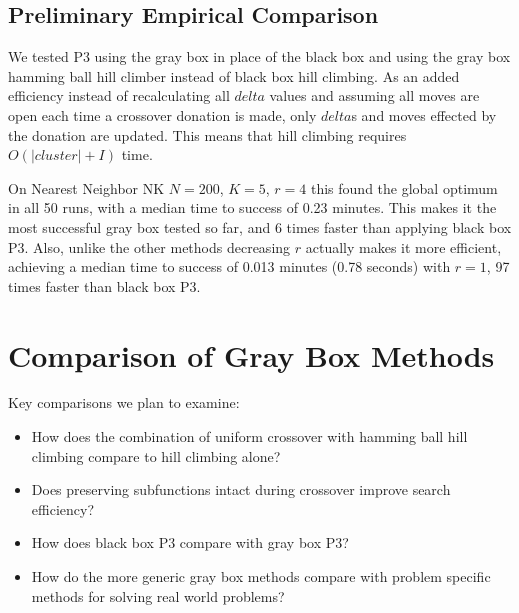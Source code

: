 \subsection{Preliminary Empirical Comparison}
We tested P3 using the gray box  in place of the black box 
and using the gray box hamming ball hill climber instead of black box hill climbing. As an added efficiency
instead of recalculating all $delta$ values and assuming all moves are open each time a crossover donation is made,
only $delta$s and moves effected by the donation are updated. This means that hill climbing requires $O(|cluster|+I)$
time.

On Nearest Neighbor NK
$N=200$, $K=5$, $r=4$ this found the global optimum in all 50 runs, with a median time to success of 0.23 minutes. This makes it the
most successful gray box tested so far, and 6 times faster than applying black box P3. Also, unlike the other
methods decreasing $r$ actually makes it more efficient, achieving a median time to success of 0.013 minutes (0.78 seconds) with $r=1$,
97 times faster than black box P3.
\section{Comparison of Gray Box Methods}
Key comparisons we plan to examine:
\begin{itemize}
\item How does the combination of uniform crossover with hamming ball hill climbing compare to hill climbing alone?
\item Does preserving subfunctions intact during crossover improve search efficiency?
\item How does black box P3 compare with gray box P3?
\item How do the more generic gray box methods compare with problem specific methods for solving real world problems?
\end{itemize}

